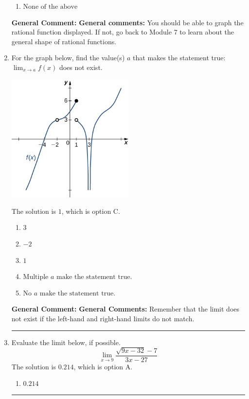 \documentclass{extbook}[14pt]
\newcommand{\litem}[1]{\item #1

\rule{\textwidth}{0.4pt}}
\begin{document}
\begin{enumerate}
{\begin{enumerate}[label=\Alph*.]
\item \( \text{None of the above} \)


\end{enumerate}

\textbf{General Comment:} \textbf{General comments:} You should be able to graph the rational function displayed. If not, go back to Module 7 to learn about the general shape of rational functions.
}
\litem{
For the graph below, find the value(s) $a$ that makes the statement true: $ \displaystyle \lim_{x \rightarrow a} f(x)$ does not exist.

\begin{center}
    \includegraphics[width=0.5\textwidth]{../Figures/evaluateLimitGraphicallyCopyC.png}
\end{center}


The solution is \( 1 \), which is option C.\begin{enumerate}[label=\Alph*.]
\item \( 3 \)


\item \( -2 \)


\item \( 1 \)


\item \( \text{Multiple } a \text{ make the statement true}. \)


\item \( \text{No } a \text{ make the statement true}. \)


\end{enumerate}

\textbf{General Comment:} \textbf{General Comments:} Remember that the limit does not exist if the left-hand and right-hand limits do not match.
}
\litem{
Evaluate the limit below, if possible.
\[ \lim_{x \rightarrow 9} \frac{\sqrt{9x - 32} - 7}{3x - 27} \]The solution is \( 0.214 \), which is option A.\begin{enumerate}[label=\Alph*.]
\item \( 0.214 \)


\end{enumerate}}
\end{enumerate}
\end{document}
